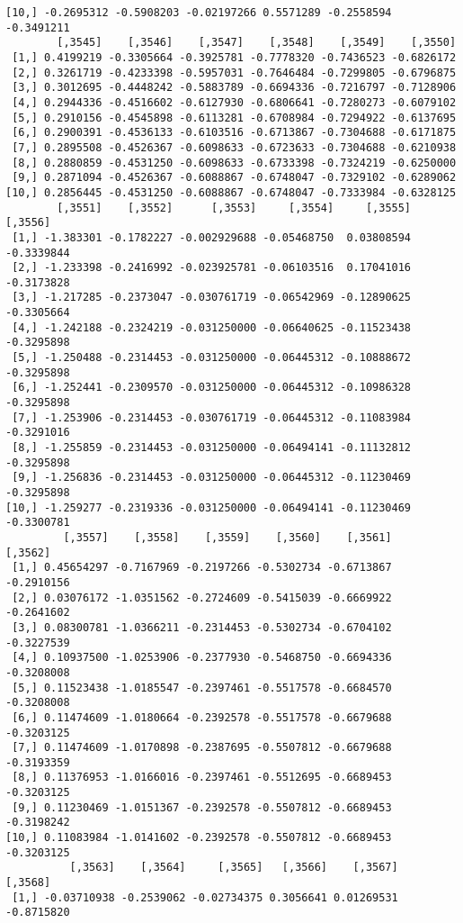 \documentclass[
  letterpaper,
  DIV=11,
  numbers=noendperiod]{scrreprt}
\begin{document}
\begin{verbatim}
[10,] -0.2695312 -0.5908203 -0.02197266 0.5571289 -0.2558594 -0.3491211
        [,3545]    [,3546]    [,3547]    [,3548]    [,3549]    [,3550]
 [1,] 0.4199219 -0.3305664 -0.3925781 -0.7778320 -0.7436523 -0.6826172
 [2,] 0.3261719 -0.4233398 -0.5957031 -0.7646484 -0.7299805 -0.6796875
 [3,] 0.3012695 -0.4448242 -0.5883789 -0.6694336 -0.7216797 -0.7128906
 [4,] 0.2944336 -0.4516602 -0.6127930 -0.6806641 -0.7280273 -0.6079102
 [5,] 0.2910156 -0.4545898 -0.6113281 -0.6708984 -0.7294922 -0.6137695
 [6,] 0.2900391 -0.4536133 -0.6103516 -0.6713867 -0.7304688 -0.6171875
 [7,] 0.2895508 -0.4526367 -0.6098633 -0.6723633 -0.7304688 -0.6210938
 [8,] 0.2880859 -0.4531250 -0.6098633 -0.6733398 -0.7324219 -0.6250000
 [9,] 0.2871094 -0.4526367 -0.6088867 -0.6748047 -0.7329102 -0.6289062
[10,] 0.2856445 -0.4531250 -0.6088867 -0.6748047 -0.7333984 -0.6328125
        [,3551]    [,3552]      [,3553]     [,3554]     [,3555]    [,3556]
 [1,] -1.383301 -0.1782227 -0.002929688 -0.05468750  0.03808594 -0.3339844
 [2,] -1.233398 -0.2416992 -0.023925781 -0.06103516  0.17041016 -0.3173828
 [3,] -1.217285 -0.2373047 -0.030761719 -0.06542969 -0.12890625 -0.3305664
 [4,] -1.242188 -0.2324219 -0.031250000 -0.06640625 -0.11523438 -0.3295898
 [5,] -1.250488 -0.2314453 -0.031250000 -0.06445312 -0.10888672 -0.3295898
 [6,] -1.252441 -0.2309570 -0.031250000 -0.06445312 -0.10986328 -0.3295898
 [7,] -1.253906 -0.2314453 -0.030761719 -0.06445312 -0.11083984 -0.3291016
 [8,] -1.255859 -0.2314453 -0.031250000 -0.06494141 -0.11132812 -0.3295898
 [9,] -1.256836 -0.2314453 -0.031250000 -0.06445312 -0.11230469 -0.3295898
[10,] -1.259277 -0.2319336 -0.031250000 -0.06494141 -0.11230469 -0.3300781
         [,3557]    [,3558]    [,3559]    [,3560]    [,3561]    [,3562]
 [1,] 0.45654297 -0.7167969 -0.2197266 -0.5302734 -0.6713867 -0.2910156
 [2,] 0.03076172 -1.0351562 -0.2724609 -0.5415039 -0.6669922 -0.2641602
 [3,] 0.08300781 -1.0366211 -0.2314453 -0.5302734 -0.6704102 -0.3227539
 [4,] 0.10937500 -1.0253906 -0.2377930 -0.5468750 -0.6694336 -0.3208008
 [5,] 0.11523438 -1.0185547 -0.2397461 -0.5517578 -0.6684570 -0.3208008
 [6,] 0.11474609 -1.0180664 -0.2392578 -0.5517578 -0.6679688 -0.3203125
 [7,] 0.11474609 -1.0170898 -0.2387695 -0.5507812 -0.6679688 -0.3193359
 [8,] 0.11376953 -1.0166016 -0.2397461 -0.5512695 -0.6689453 -0.3203125
 [9,] 0.11230469 -1.0151367 -0.2392578 -0.5507812 -0.6689453 -0.3198242
[10,] 0.11083984 -1.0141602 -0.2392578 -0.5507812 -0.6689453 -0.3203125
          [,3563]    [,3564]     [,3565]   [,3566]    [,3567]    [,3568]
 [1,] -0.03710938 -0.2539062 -0.02734375 0.3056641 0.01269531 -0.8715820

\end{verbatim}
\end{document}
